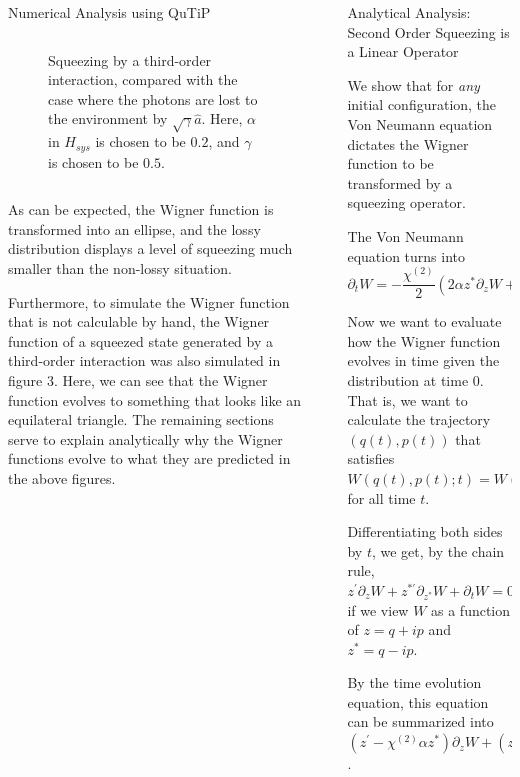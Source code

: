 \documentclass[final]{beamer}
\newlength{\sepwidth}
\newlength{\colwidth}
\newcommand{\separatorcolumn}{\begin{column}{\sepwidth}\end{column}}
\begin{document}
\begin{frame}[t]
\begin{columns}[t]
\begin{column}{\colwidth}
\begin{block}{Numerical Analysis using QuTiP}
\begin{columns}
\begin{column}{0.5\textwidth}
\begin{figure}
              \caption{Squeezing by a third-order interaction, compared with the case where the photons are lost to the environment by $\sqrt{\gamma}\hat{a}$. Here, $\alpha$ in $H_{sys}$ is chosen to be $0.2$, and $\gamma$ is chosen to be $0.5$.}
            \end{figure}
          \end{column}
        \end{columns}
        As can be expected, the Wigner function is transformed into an ellipse, and the lossy distribution displays a level of squeezing much smaller than the non-lossy situation.

        Furthermore, to simulate the Wigner function that is not calculable by hand, the Wigner function of a squeezed state generated by a third-order interaction was also simulated in figure 3.
        Here, we can see that the Wigner function evolves to something that looks like an equilateral triangle.
        The remaining sections serve to explain analytically why the Wigner functions evolve to what they are predicted in the above figures.
      \end{block}

    \end{column}

    \separatorcolumn

    \begin{column}{\colwidth}

      \begin{block}{Analytical Analysis: Second Order Squeezing is a Linear Operator}

        We show that for \textit{any} initial configuration, the Von Neumann equation dictates the Wigner function to be transformed by a squeezing operator.

        The Von Neumann equation turns into
        \[\partial_{t}W=-\frac{\chi^{(2)}}{2}(2\alpha z^{*}\partial_{z}W+2\alpha^{*}z\partial_{z^{*}}W)\]

        Now we want to evaluate how the Wigner function evolves in time given the distribution at time $0$.
        That is, we want to calculate the trajectory $(q(t), p(t))$ that satisfies $W(q(t),p(t);t)=W(q(0),p(0);0)$
        for all time $t$.

        Differentiating both sides by $t$, we get, by the chain rule,
        $z^{\prime}\partial_{z}W+z^{*\prime}\partial_{z^{*}}W+\partial_{t}W=0$
        if we view $W$ as a function of $z=q+ip$ and $z^{*}=q-ip$.

        By the time evolution equation, this equation can be summarized into
        $(z^{\prime}-\chi^{(2)}\alpha z^{*})\partial_{z}W+(z^{*\prime}-\chi^{(2)}\alpha^{*} z)\partial_{z^{*}}W=0$.


\end{block}
\end{column}
\end{columns}
\end{frame}
\end{document}
